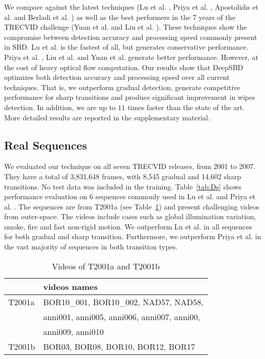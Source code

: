 \documentclass[journal]{IEEEtran}
\begin{document}
We compare against the latest techniques (Lu et al. \cite{Lu13}, Priya et al. \cite{Priya14}, Apostolidis et al. \cite{Apostolidis14} and Berladi et al. \cite{Berladi15}) as well as the best performers in the 7 years of the TRECVID challenge (Yuan et al. \cite{Yuan04} and Liu et al. \cite{Liu07}). These techniques show the compromise between detection accuracy and processing speed commonly present in SBD. Lu et al. \cite{Lu13} is the fastest of all, but generates conservative performance. Priya et al. \cite{Priya14}, Liu et al. \cite{Liu07} and Yuan et al. \cite{Yuan04} generate better performance. However, at the cost of heavy optical flow computation. Our results show that DeepSBD optimizes both detection accuracy and processing speed over all current techniques. That is, we outperform gradual detection, generate competitive performance for sharp transitions and produce significant improvement in wipes detection. In addition, we are up to $11$ times faster than the state of the art. More detailed results are reported in the supplementary material. 

\subsection{Real Sequences} 

We evaluated our technique on all seven TRECVID releases, from 2001 to 2007. They have a total of 3,831,648 frames, with 8,545 gradual and 14,602 sharp transitions. No test data was included in the training. Table~\ref{tab:Ds} shows performance evaluation on 6 sequences commonly used in Lu et al. \cite{Lu13} and Priya et al. \cite{Priya14}. The sequences are from T2001a (see Table~\ref{tab:2001ab}) and present challenging videos from outer-space. The videos include cases such as global illumination variation, smoke, fire and fast non-rigid motion. We outperform Lu et al. in all sequences for both gradual and sharp transition. Furthermore, we outperform Priya et al. in the vast majority of sequences in both transition types. 

\begin{table}
\centering
\small
\begin{tabular}{|l | l |}
     \hline      
												                   & videos names       \\
			\hline 
				 T2001a                        & BOR10\_001, BOR10\_002, NAD57, NAD58, \\
				                               & anni001, anni005, anni006, anni007, anni00, \\
																			 & anni009, anni010   \\ 
						\hline															
				 T2001b                           & BOR03, BOR08, BOR10, BOR12, BOR17 \\ 
			\hline
    \end{tabular}\vspace{3pt}
\caption{Videos of T2001a and T2001b}
\label{tab:2001ab}
\end{table}
\end{document}
